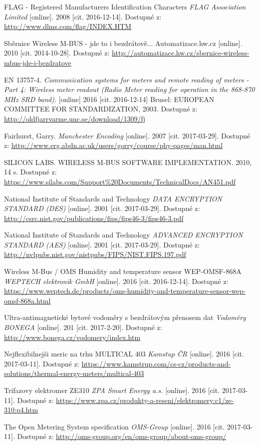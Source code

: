 \begin{literatura}{99}
 FLAG - Registered Manufacturers Identification Characters \textit{FLAG Association Limited} [online]. 2008 [cit. 2016-12-14]. Dostupné z: \url{http://www.dlms.com/flag/INDEX.HTM}

 Sběrnice Wireless M-BUS - jde to i bezdrátově... Automatizace.hw.cz [online]. 2010 [cit. 2014-10-28]. Dostupné z: \url{http://automatizace.hw.cz/sbernice-wireless-mbus-jde-i-bezdratove}

 EN 13757-4. \textit{Communication systems for meters and remote reading of meters - Part 4: Wireless meter readout (Radio Meter reading for operation in the 868-870 MHz SRD band)}. [online] 2016 [cit. 2016-12-14] Brusel: EUROPEAN COMMITTEE FOR STANDARDIZATION, 2003. Dostupné z: \url{http://oldfjarrvarme.unc.se/download/1309/fj}

 Fairhurst, Garry. \textit{Manchester Encoding} [online]. 2007 [cit. 2017-03-29]. Dostupné z: \url{http://www.erg.abdn.ac.uk/users/gorry/course/phy-pages/man.html} 

 SILICON LABS. WIRELESS M-BUS SOFTWARE IMPLEMENTATION. 2010, 14 s. Dostupné z: \url{https://www.silabs.com/Support\%20Documents/TechnicalDocs/AN451.pdf}

 National Institute of Standards and Technology \textit{DATA ENCRYPTION STANDARD (DES)} [online]. 2001 [cit. 2017-03-29]. Dostupné z: \url{http://csrc.nist.gov/publications/fips/fips46-3/fips46-3.pdf}

 National Institute of Standards and Technology \textit{ADVANCED ENCRYPTION STANDARD (AES)} [online]. 2001 [cit. 2017-03-29]. Dostupné z: \url{http://nvlpubs.nist.gov/nistpubs/FIPS/NIST.FIPS.197.pdf}

 Wireless M-Bus / OMS Humidity and temperature sensor WEP-OMSF-868A \textit{WEPTECH elektronik GmbH} [online]. 2016 [cit. 2016-12-14]. Dostupné z: \url{https://www.weptech.de/products/oms-humidity-and-temperature-sensor-wep-omsf-868a.html}

 Ultra-antimagnetické bytové vodoměry s bezdrátovým přenosem dat \textit{Vodoměry BONEGA} [online]. 201 [cit. 2017-2-20]. Dostupné z: \url{http://www.bonega.cz/vodomery/index.htm}

 Nejflexibilnejši meric na trhu MULTICAL 403 \textit{Kamstup ČR} [online]. 2016 [cit. 2017-03-11]. Dostupné z: \url{https://www.kamstrup.com/cs-cz/products-and-solutions/thermal-energy-meters/multical-403}

 Trifazovy elektromer ZE310 \textit{ZPA Smart Energy a.s.} [online]. 2016 [cit. 2017-03-11]. Dostupné z: \url{https://www.zpa.cz/produkty-a-reseni/elektromery:c1/ze-310:p4.htm}

 The Open Metering System specification \textit{OMS-Group} [online]. 2016 [cit. 2017-03-11]. Dostupné z: \url{http://oms-group.org/en/oms-group/about-oms-group/}




\end{literatura}

